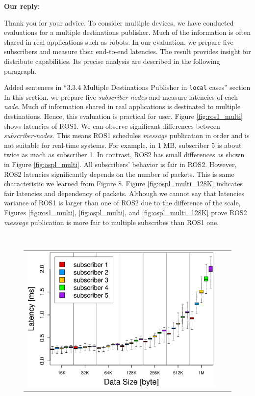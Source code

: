 \documentclass{article}
\begin{document}
\begin{enumerate}
  \begin{flushleft}
    \textbf{Our reply:}
  \end{flushleft}
  Thank you for your advice.
  To consider multiple devices, we have conducted evaluations for a multiple destinations publisher.
  Much of the information is often shared in real applications such as robots.
  In our evaluation, we prepare five subscribers and measure their end-to-end latencies.
  The result provides insight for distribute capabilities.
  Its precise analysis are described in the following paragraph.
  \begin{itembox}[|]{Added sentences in ``3.3.4 Multiple Destinations Publisher in \texttt{local} cases'' section}
    In this section, we prepare five \emph{subscriber-nodes} and measure latencies of each \emph{node}.
    Much of information shared in real applications is destinated to multiple destinations.
    Hence, this evaluation is practical for user.
    Figure \ref{fig:ros1_multi} shows latencies of ROS1.
    We can observe significant differences between \emph{subscriber-nodes}.
    This means ROS1 schedules \emph{message} publication in order and is not suitable for real-time systems.
    For example, in 1 MB, subscriber 5 is about twice as mach as subscriber 1.
    In contrast, ROS2 has small differences as shown in Figure \ref{fig:ospl_multi}.
    All subscribers' behavior is fair in ROS2.
    However, ROS2 latencies significantly depends on the number of packets.
    This is same characteristic we learned from Figure 8.
    Figure \ref{fig:ospl_multi_128K} indicates fair latencies and dependency of packets.
    Although we cannot say that latencies variance of ROS1 is larger than one of ROS2 due to the difference of the scale, Figures \ref{fig:ros1_multi}, \ref{fig:ospl_multi}, and \ref{fig:ospl_multi_128K} prove ROS2 \emph{message} publication is more fair to multiple subscribes than ROS1 one.
  \end{itembox}\\
  \clearpage
  \setcounter{figure}{16}
  \begin{figure}[h]
    \begin{tabular}{ccc}
      \begin{minipage}[t]{0.31\textwidth}
        \includegraphics[width=1.0\linewidth]{../../figure/BoxPlot_ros1_1M_multi-pub5.eps}

\end{minipage}
\end{tabular}
\end{figure}
\end{enumerate}
\end{document}
